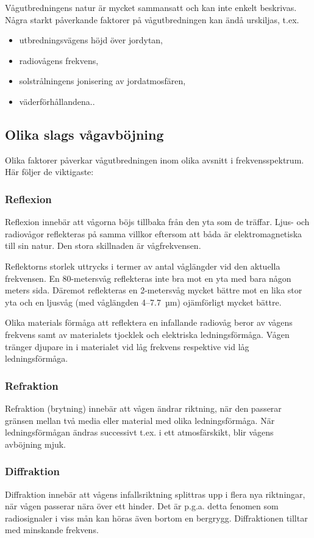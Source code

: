 Vågutbredningens natur är mycket sammansatt och kan inte enkelt
beskrivas. Några starkt påverkande faktorer på vågutbredningen kan
ändå urskiljas, t.ex.
\begin{itemize}
\item utbredningsvägens höjd över jordytan,
\item radiovågens frekvens,
\item solstrålningens jonisering av jordatmosfären,
\item väderförhållandena..
\end{itemize}

\subsection{Olika slags vågavböjning}

Olika faktorer påverkar vågutbredningen inom olika avsnitt i
frekvensspektrum. Här följer de viktigaste:

\subsubsection{Reflexion}

Reflexion innebär att vågorna böjs tillbaka från den yta som de
träffar. Ljus- och radiovågor reflekteras på samma villkor eftersom
att båda är elektromagnetiska till sin natur.  Den stora skillnaden är
vågfrekvensen.

Reflektorns storlek uttrycks i termer av antal våglängder vid den
aktuella frekvensen. En 80-metersvåg reflekteras inte bra mot en yta
med bara någon meters sida.  Däremot reflekteras en 2-metersvåg mycket
bättre mot en lika stor yta och en ljusvåg (med våglängden 4--7.7~µm)
ojämförligt mycket bättre.

Olika materials förmåga att reflektera en infallande radiovåg beror av
vågens frekvens samt av materialets tjocklek och elektriska
ledningsförmåga. Vågen tränger djupare in i materialet vid låg
frekvens respektive vid låg ledningsförmåga.

\subsubsection{Refraktion}

Refraktion (brytning) innebär att vågen ändrar riktning, när den
passerar gränsen mellan två media eller material med olika
ledningsförmåga. När ledningsförmågan ändras successivt t.ex. i ett
atmosfärskikt, blir vågens avböjning mjuk.

\subsubsection{Diffraktion}

Diffraktion innebär att vågens infallsriktning splittras upp i flera
nya riktningar, när vågen passerar nära över ett hinder. Det är p.g.a.
detta fenomen som radiosignaler i viss mån kan höras även bortom en
bergrygg. Diffraktionen tilltar med minskande frekvens.
